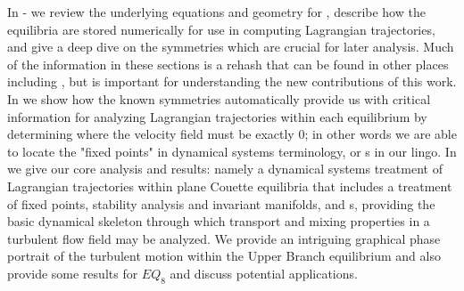 In - we review the underlying equations 
and geometry for {\pCf}, describe how the equilibria are stored 
numerically for use in computing Lagrangian trajectories, and give a deep 
dive on the symmetries which are crucial for later analysis. Much of the 
information in these sections is a rehash that can be found in other 
places including \cite{GHCW07}, but is important for understanding the 
new contributions of this work.  In  we show how 
the known symmetries automatically provide us with critical information 
for analyzing Lagrangian trajectories within each equilibrium by 
determining where the velocity field must be exactly 0; in other words we 
are able to locate the "fixed points" in dynamical systems terminology, 
or {\stagp}s in our lingo. In  we give our core 
analysis and results: namely a dynamical systems treatment of Lagrangian 
trajectories within plane Couette equilibria that includes a treatment of 
fixed points, stability analysis and invariant manifolds, and {\hc}s, 
providing the basic dynamical skeleton through which transport and mixing 
properties in a turbulent flow field may be analyzed. We provide an 
intriguing graphical phase portrait of the turbulent motion within the 
Upper Branch equilibrium and also provide some results for $EQ_8$ and 
discuss potential applications. 

